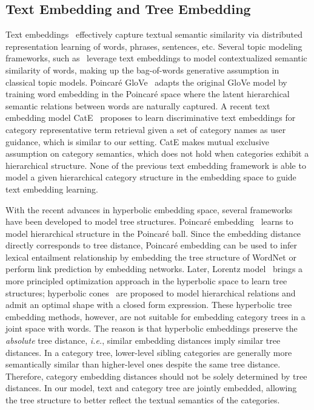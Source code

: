 \documentclass[sigconf]{acmart}
\newcommand{\ie}{\emph{i.e.}}
\theoremstyle{definition}
\begin{document}
\subsection{Text Embedding and Tree Embedding}
Text embeddings~\cite{Le2014DistributedRO,Mikolov2013DistributedRO,meng2019spherical,meng2020unsupervised,Pennington2014GloveGV} effectively capture textual semantic similarity via distributed representation learning of words, phrases, sentences, etc. Several topic modeling frameworks, such as~\cite{batmanghelich2016nonparametric,Dieng2019TopicMI,Liu2015TopicalWE} leverage text embeddings to model contextualized semantic similarity of words, making up the bag-of-words generative assumption in classical topic models.
Poincar{\'e} GloVe~\cite{Tifrea2019PoincareGH} adapts the original GloVe model by training word embedding in the Poincar{\'e} space where the latent hierarchical semantic relations between words are naturally captured.
A recent text embedding model CatE~\cite{Meng2020DiscriminativeTM} proposes to learn discriminative text embeddings for category representative term retrieval given a set of category names as user guidance, which is similar to our setting. CatE makes mutual exclusive assumption on category semantics, which does not hold when categories exhibit a hierarchical structure. None of the previous text embedding framework is able to model a given hierarchical category structure in the embedding space to guide text embedding learning.

With the recent advances in hyperbolic embedding space, several frameworks have been developed to model tree structures. Poincar{\'e}  embedding~\cite{Nickel2017PoincarEF} learns to model hierarchical structure in the Poincar{\'e} ball. Since the embedding distance directly corresponds to tree distance, Poincar{\'e} embedding can be used to infer lexical entailment relationship by embedding the tree structure of WordNet or perform link prediction by embedding networks.
Later, Lorentz model~\cite{Nickel2018LearningCH} brings a more principled optimization approach in the hyperbolic space to learn tree structures; hyperbolic cones~\cite{Ganea2018HyperbolicEC} are proposed to model hierarchical relations
and admit an optimal shape with a closed form expression. 
These hyperbolic tree embedding methods, however, are not suitable for embedding category trees in a joint space with words. The reason is that hyperbolic embeddings preserve the \emph{absolute} tree distance, \ie, similar embedding distances imply similar tree distances. In a category tree, lower-level sibling categories are generally more semantically similar than higher-level ones despite the same tree distance. Therefore, category embedding distances should not be solely determined by tree distances. In our model, text and category tree are jointly embedded, allowing the tree structure to better reflect the textual semantics of the categories. 
\end{document}
